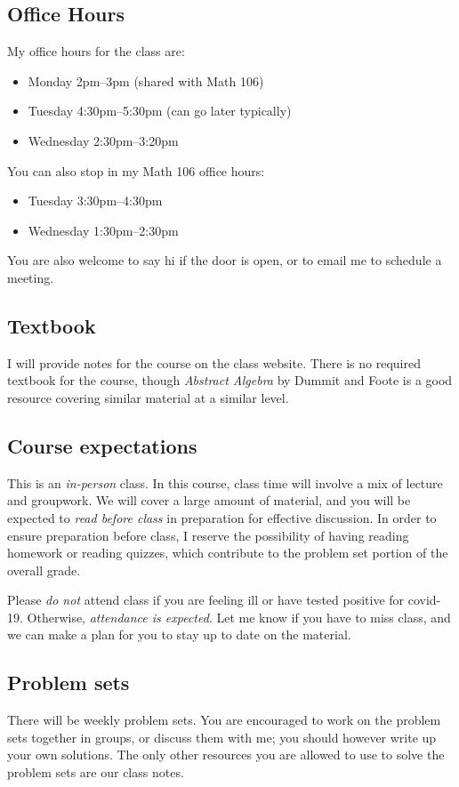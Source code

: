 \documentclass[12pt]{amsart}
\begin{document}
	\subsection*{Office Hours}  My office hours for the class are:
\begin{itemize}\item Monday 2pm--3pm (shared with Math 106)
\item Tuesday 4:30pm--5:30pm (can go later typically)
\item Wednesday 2:30pm--3:20pm
\end{itemize}
You can also stop in my Math 106 office hours:
\begin{itemize}\item Tuesday 3:30pm--4:30pm
\item Wednesday 1:30pm--2:30pm
\end{itemize} You are also welcome to say hi if the door is open, or to email me to schedule a meeting.
	\subsection*{Textbook} 
	
	I will provide notes for the course on the class website. There is no required textbook for the course, though \textit{Abstract Algebra} by Dummit and Foote is a good resource covering similar material at a similar level. 

	
\subsection*{Course expectations} 
This is an {\it in-person} class.  In this course, class time will involve a mix of lecture and groupwork. We will cover a large amount of material, and you will be expected to {\it read before class} in preparation for effective discussion. In order to ensure preparation before class, I reserve the possibility of having reading homework or reading quizzes, which contribute to the problem set portion of the overall grade.

Please {\it do not} attend class if you are feeling ill or have tested positive for covid-19. Otherwise, {\it attendance is expected}. Let me know if you have to miss class, and we can make a plan for you to stay up to date on the material.



\subsection*{Problem sets}
There will be weekly problem sets. You are encouraged to work on the problem sets together in groups, or discuss them with me; you should however write up your own solutions. The only other resources you are allowed to use to solve the problem sets are our class notes.
\end{document}

